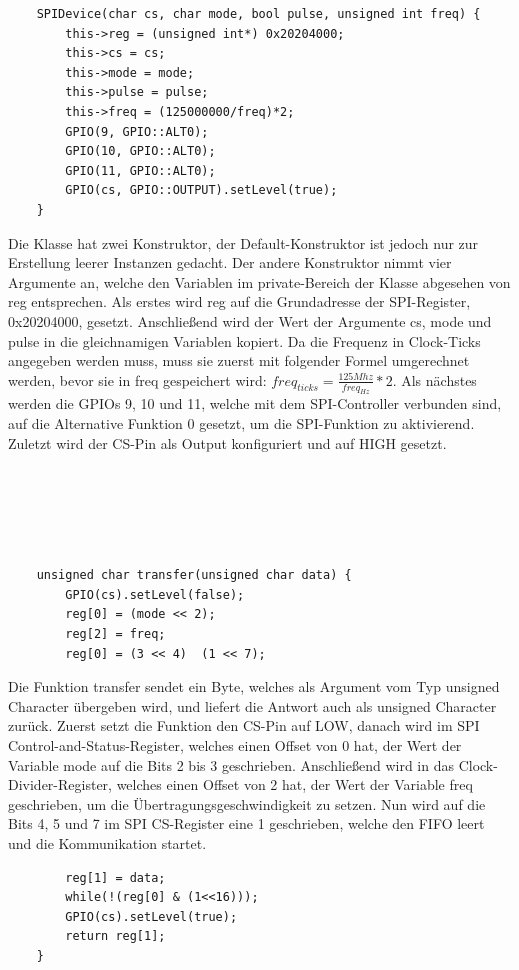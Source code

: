 \documentclass[12pt]{article}
\begin{document}
\begin{verbatim}
    SPIDevice(char cs, char mode, bool pulse, unsigned int freq) {
        this->reg = (unsigned int*) 0x20204000;
        this->cs = cs;
        this->mode = mode;
        this->pulse = pulse;
        this->freq = (125000000/freq)*2;
        GPIO(9, GPIO::ALT0);
        GPIO(10, GPIO::ALT0);
        GPIO(11, GPIO::ALT0);
        GPIO(cs, GPIO::OUTPUT).setLevel(true);
    }
\end{verbatim}
Die Klasse hat zwei Konstruktor, der Default-Konstruktor ist jedoch nur zur Erstellung leerer Instanzen gedacht. Der andere Konstruktor nimmt vier Argumente an, welche den Variablen im private-Bereich der Klasse abgesehen von reg entsprechen. Als erstes wird reg auf die Grundadresse der SPI-Register, 0x20204000, gesetzt. Anschließend wird der Wert der Argumente cs, mode und pulse in die gleichnamigen Variablen kopiert. Da die Frequenz in Clock-Ticks angegeben werden muss, muss sie zuerst mit folgender Formel umgerechnet werden, bevor sie in freq gespeichert wird: $freq_{ticks} = \frac{125 Mhz}{freq_{Hz}} * 2$. Als nächstes werden die GPIOs 9, 10 und 11, welche mit dem SPI-Controller verbunden sind, auf die Alternative Funktion 0 gesetzt, um die SPI-Funktion zu aktivierend. Zuletzt wird der CS-Pin als Output konfiguriert und auf HIGH gesetzt.\\\\\\\\\\\\
\begin{verbatim}
    unsigned char transfer(unsigned char data) {
        GPIO(cs).setLevel(false);
        reg[0] = (mode << 2);
        reg[2] = freq;
        reg[0] = (3 << 4)  (1 << 7);
\end{verbatim}        
Die Funktion transfer sendet ein Byte, welches als Argument vom Typ unsigned Character
übergeben wird, und liefert die Antwort auch als unsigned Character zurück. Zuerst setzt die Funktion den CS-Pin auf LOW, danach wird im SPI Control-and-Status-Register, welches einen Offset von 0 hat, der Wert der Variable mode auf die Bits 2 bis 3 geschrieben. Anschließend wird in das Clock-Divider-Register, welches einen Offset von 2 hat, der Wert der Variable freq geschrieben, um die Übertragungsgeschwindigkeit zu setzen. Nun wird auf die Bits 4, 5 und 7 im SPI CS-Register eine 1 geschrieben, welche den FIFO leert und die Kommunikation startet. \\
\begin{verbatim}
        reg[1] = data;
        while(!(reg[0] & (1<<16)));
        GPIO(cs).setLevel(true);
        return reg[1];
    }
\end{verbatim}
\end{document}
